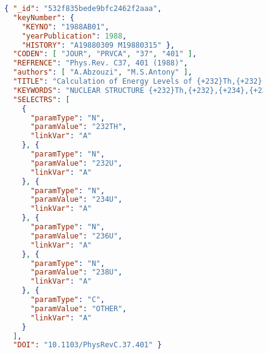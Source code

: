 \documentclass[12pt]{article}
\begin{document}
\begin{doublespacing}
\begin{figure}[!h] \label{exJSON}
\begin{lstlisting}[language=json,firstnumber=1]
{ "_id": "532f835bede9bfc2462f2aaa",
  "keyNumber": {
    "KEYNO": "1988AB01",
    "yearPublication": 1988,
    "HISTORY": "A19880309 M19880315" },
  "CODEN": [ "JOUR", "PRVCA", "37", "401" ],
  "REFRENCE": "Phys.Rev. C37, 401 (1988)",
  "authors": [ "A.Abzouzi", "M.S.Antony" ],
  "TITLE": "Calculation of Energy Levels of {+232}Th,{+232}{+-}{+238}U for K(|p) = 0{++} Ground State Bands",
  "KEYWORDS": "NUCLEAR STRUCTURE {+232}Th,{+232},{+234},{+236},{+238}U; calculated levels,band features. Semi-empirical formalism.",
  "SELECTRS": [
    {
      "paramType": "N",
      "paramValue": "232TH",
      "linkVar": "A"
    }, {
      "paramType": "N",
      "paramValue": "232U",
      "linkVar": "A"
    }, {
      "paramType": "N",
      "paramValue": "234U",
      "linkVar": "A"
    }, {
      "paramType": "N",
      "paramValue": "236U",
      "linkVar": "A"
    }, {
      "paramType": "N",
      "paramValue": "238U",
      "linkVar": "A"
    }, {
      "paramType": "C",
      "paramValue": "OTHER",
      "linkVar": "A"
    }
  ],
  "DOI": "10.1103/PhysRevC.37.401" }
\end{lstlisting} \end{figure}

\end{doublespacing}

\pagebreak

\end{document}

